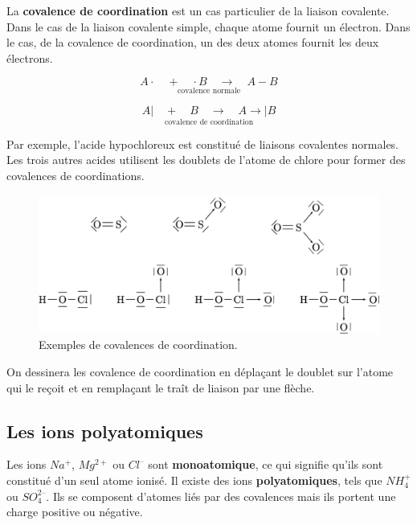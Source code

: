 \documentclass[
  11pt,
  a4paper,
  openany]{book}
\begin{document}
La \textbf{covalence de coordination} est un cas particulier de la liaison covalente. Dans le cas de la liaison covalente simple, chaque atome fournit un électron. Dans le cas, de la covalence de coordination, un des deux atomes fournit les deux électrons.

\[ \underset{\text{covalence normale}}{A \cdot \quad + \quad \cdot B \quad \longrightarrow \quad A - B} \]

\[ \underset{\text{covalence de coordination}}{A | \quad + \quad B \quad \longrightarrow \quad A \rightarrow | B} \]

Par exemple, l'acide hypochloreux est constitué de liaisons covalentes normales. Les trois autres acides utilisent les doublets de l'atome de chlore pour former des covalences de coordinations.

\begin{figure}

{\centering \includegraphics[width=0.85\linewidth]{images/covalences-coordination} 

}

\caption{Exemples de covalences de coordination.}\label{fig:covalences-coordination}
\end{figure}

On dessinera les covalence de coordination en déplaçant le doublet sur l'atome qui le reçoit et en remplaçant le traît de liaison par une flèche.

\hypertarget{les-ions-polyatomiques}{%
\subsection{Les ions polyatomiques}\label{les-ions-polyatomiques}}

Les ions \(Na^+\), \(Mg^{2+}\) ou \(Cl^–\) sont \textbf{monoatomique}, ce qui signifie qu'ils sont constitué d'un seul atome ionisé. Il existe des ions \textbf{polyatomiques}, tels que \(NH_4^+\) ou \(SO_4^{2–}\). Ils se composent d'atomes liés par des covalences mais ils portent une charge positive ou négative.
\end{document}
